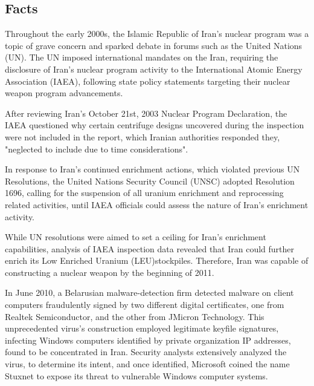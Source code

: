 \documentclass[12pt]{article}
\begin{document}
\begin{multicols}{2}

\section{Facts}

Throughout the early 2000s, the Islamic Republic of Iran's nuclear program was a topic of grave concern and sparked debate in forums such as the United Nations (UN).\cite{unitedNationsResolutions} The UN imposed international mandates on the Iran, requiring the disclosure of Iran's nuclear program activity to the International Atomic Energy Association (IAEA), following state policy statements targeting their nuclear weapon program advancements. 

After reviewing Iran's October 21st, 2003 Nuclear Program Declaration, the IAEA questioned why certain centrifuge designs uncovered during the inspection were not included in the report, which Iranian authorities responded they, "neglected to include due to time considerations".\cite{implementationOfNPTSafeguards}

In response to Iran's continued enrichment actions, which violated previous UN Resolutions, the United Nations Security Council (UNSC) adopted Resolution 1696, calling for the suspension of all uranium enrichment and reprocessing related activities, until IAEA officials could assess the nature of Iran's enrichment activity.\cite{resolution1696}

While UN resolutions were aimed to set a ceiling for Iran's enrichment capabilities, analysis of IAEA inspection data revealed that Iran could further enrich its Low Enriched Uranium (LEU)\footnotemark[1] stockpiles.  Therefore, Iran was capable of constructing a nuclear weapon by the beginning of 2011.\cite{hasIranAchievedaNuclearWeapon}


In June 2010, a Belarusian malware-detection firm detected malware on client computers fraudulently signed by two different digital certificates, one from Realtek Semiconductor, and the other from JMicron Technology.\cite{theRealStoryOfStuxnet} This unprecedented virus's construction employed legitimate keyfile signatures, infecting Windows computers identified by private organization IP addresses, found to be concentrated in Iran.\cite{w32.stuxnetDossier} Security analysts extensively analyzed the virus, to determine its intent, and once identified, Microsoft coined the name Stuxnet to expose its threat to vulnerable Windows computer systems.\cite{microsoftCoinsStuxnet}


\end{multicols}
\end{document}

